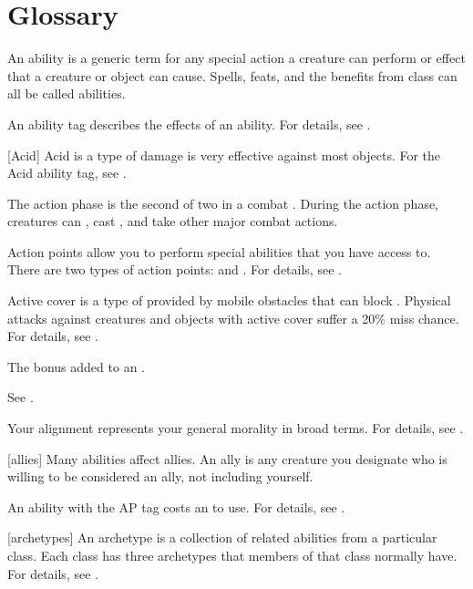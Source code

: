 \chapter{Glossary}\label{Glossary}

 An ability is a generic term for any special action a creature can perform or effect that a creature or object can cause.
Spells, feats, and the benefits from class  can all be called abilities.

 An ability tag describes the effects of an ability.
For details, see .

[Acid] Acid is a type of damage is very effective against most objects.
For the Acid ability tag, see .

 The action phase is the second of two  in a combat .
During the action phase, creatures can , cast , and take other major combat actions.

 Action points allow you to perform special abilities that you have access to.
There are two types of action points:  and .
For details, see .

 Active cover is a type of  provided by mobile obstacles that can block .
Physical attacks against creatures and objects with active cover suffer a 20\% miss chance.
For details, see .

 The bonus added to an .

 See .

 Your alignment represents your general morality in broad terms.
For details, see .

[allies] Many abilities affect allies.
An ally is any creature you designate who is willing to be considered an ally, not including yourself.

 An ability with the AP tag costs an  to use.
For details, see .

[archetypes] An archetype is a collection of related abilities from a particular class.
Each class has three archetypes that members of that class normally have.
For details, see .

